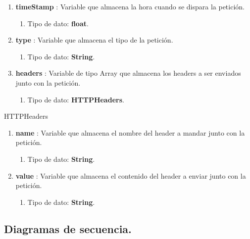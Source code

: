 \documentclass[12pt, a4paper, titlepage]{report}
\begin{document}
\begin{enumerate}
\begin{enumerate}
    		        \end{enumerate}
    		        \item \textbf{timeStamp} : Variable que almacena la hora cuando se dispara la petición.
    		        \begin{enumerate}
    		            \item Tipo de dato: \textbf{float}.
    		        \end{enumerate}
    		        \item \textbf{type} : Variable que almacena el tipo de la petición.
    		        \begin{enumerate}
    		            \item Tipo de dato: \textbf{String}.
    		        \end{enumerate}
    		        \item \textbf{headers} : Variable de tipo Array que almacena los headers a ser enviados junto con la petición.
    		        \begin{enumerate}
    		            \item Tipo de dato: \textbf{HTTPHeaders}.
    		        \end{enumerate}
			    \end{enumerate}
			    
			    \large HTTPHeaders
			    \begin{enumerate}
    		        \item \textbf{name} : Variable que almacena el nombre del header a mandar junto con la petición.
    		        \begin{enumerate}
    		            \item Tipo de dato: \textbf{String}.
    		        \end{enumerate}
    		        \item \textbf{value} : Variable que almacena el contenido del header a enviar junto con la petición.
    		        \begin{enumerate}
    		            \item Tipo de dato: \textbf{String}.
    		        \end{enumerate}
			    \end{enumerate}
		    
		    
			    
			\subsection{Diagramas de secuencia.}
		    	
\end{document}
